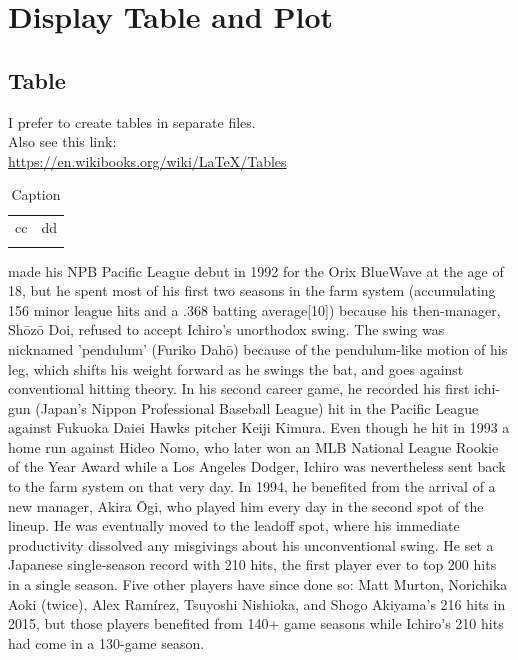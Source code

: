 \documentclass[12pt]{article}
\theoremstyle{hypotheses}
\begin{document}
\section*{Display Table and Plot}
\subsection*{Table}
I prefer to create tables in separate files.  \\
Also see this link:\\
\url{https://en.wikibooks.org/wiki/LaTeX/Tables} \\


\begin{table}[]
    \centering
    \begin{tabular}{c|c}
    cc     & dd \\
         & 
    \end{tabular}
    \caption{Caption}
    \label{tab:my_label}
\end{table}

\cite{Menaldo2016}  made his NPB Pacific League debut in 1992 for the Orix BlueWave at the age of 18, but he spent most of his first two seasons in the farm system (accumulating 156 minor league hits and a .368 batting average[10]) because his then-manager, Shōzō Doi, refused to accept Ichiro's unorthodox swing. The swing was nicknamed 'pendulum' (Furiko Dahō) because of the pendulum-like motion of his leg, which shifts his weight forward as he swings the bat, and goes against conventional hitting theory\citep{Democracy2013,Menaldo2015}. In his second career game, he recorded his first ichi-gun (Japan's Nippon Professional Baseball League) hit in the Pacific League against Fukuoka Daiei Hawks pitcher Keiji Kimura. Even though he hit in 1993 a home run against Hideo Nomo, who later won an MLB National League Rookie of the Year Award while a Los Angeles Dodger, Ichiro was nevertheless sent back to the farm system on that very day. In 1994, he benefited from the arrival of a new manager, Akira Ōgi, who played him every day in the second spot of the lineup. He was eventually moved to the leadoff spot, where his immediate productivity dissolved any misgivings about his unconventional swing. He set a Japanese single-season record with 210 hits, the first player ever to top 200 hits in a single season. Five other players have since done so: Matt Murton, Norichika Aoki (twice), Alex Ramírez, Tsuyoshi Nishioka, and Shogo Akiyama's 216 hits in 2015, but those players benefited from 140+ game seasons while Ichiro's 210 hits had come in a 130-game season.
\end{document}
